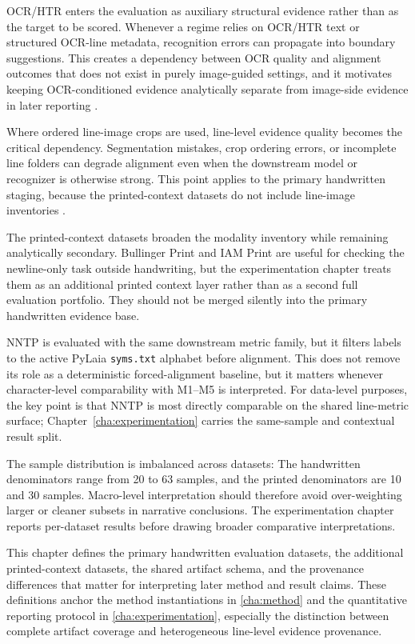 OCR/HTR enters the evaluation as auxiliary structural evidence rather than as the target to be scored. Whenever a regime relies on OCR/HTR text or structured OCR-line metadata, recognition errors can propagate into boundary suggestions. This creates a dependency between OCR quality and alignment outcomes that does not exist in purely image-guided settings, and it motivates keeping OCR-conditioned evidence analytically separate from image-side evidence in later reporting .

Where ordered line-image crops are used, line-level evidence quality becomes the critical dependency. Segmentation mistakes, crop ordering errors, or incomplete line folders can degrade alignment even when the downstream model or recognizer is otherwise strong. This point applies to the primary handwritten staging, because the printed-context datasets do not include line-image inventories .

The printed-context datasets broaden the modality inventory while remaining analytically secondary. Bullinger Print and IAM Print are useful for checking the newline-only task outside handwriting, but the experimentation chapter treats them as an additional printed context layer rather than as a second full evaluation portfolio. They should not be merged silently into the primary handwritten evidence base.

NNTP is evaluated with the same downstream metric family, but it filters labels to the active PyLaia \texttt{syms.txt} alphabet before alignment. This does not remove its role as a deterministic forced-alignment baseline, but it matters whenever character-level comparability with M1--M5 is interpreted. For data-level purposes, the key point is that NNTP is most directly comparable on the shared line-metric surface; Chapter~\ref{cha:experimentation} carries the same-sample and contextual result split.

The sample distribution is imbalanced across datasets: The handwritten denominators range from 20 to 63 samples, and the printed denominators are 10 and 30 samples. Macro-level interpretation should therefore avoid over-weighting larger or cleaner subsets in narrative conclusions. The experimentation chapter reports per-dataset results before drawing broader comparative interpretations.

\label{sec:data_summary}
This chapter defines the primary handwritten evaluation datasets, the additional printed-context datasets, the shared artifact schema, and the provenance differences that matter for interpreting later method and result claims. These definitions anchor the method instantiations in \autoref{cha:method} and the quantitative reporting protocol in \autoref{cha:experimentation}, especially the distinction between complete artifact coverage and heterogeneous line-level evidence provenance.
